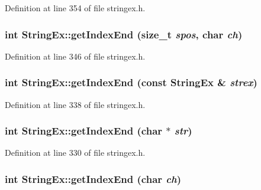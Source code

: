 Definition at line 354 of file stringex.h.\hypertarget{classStringEx_ab5c039e3571fd9d5d230ccd5e78c5bd}{
\subsubsection[{getIndexEnd}]{\setlength{\rightskip}{0pt plus 5cm}int StringEx::getIndexEnd (size\_\-t {\em spos}, \/  char {\em ch})}}
\label{classStringEx_ab5c039e3571fd9d5d230ccd5e78c5bd}




Definition at line 346 of file stringex.h.\hypertarget{classStringEx_10fce95cff1c083a94a8f705daab3e3d}{
\subsubsection[{getIndexEnd}]{\setlength{\rightskip}{0pt plus 5cm}int StringEx::getIndexEnd (const {\bf StringEx} \& {\em strex})}}
\label{classStringEx_10fce95cff1c083a94a8f705daab3e3d}




Definition at line 338 of file stringex.h.\hypertarget{classStringEx_413a4c5dd9733f92399d5b75eabfbf19}{
\subsubsection[{getIndexEnd}]{\setlength{\rightskip}{0pt plus 5cm}int StringEx::getIndexEnd (char $\ast$ {\em str})}}
\label{classStringEx_413a4c5dd9733f92399d5b75eabfbf19}




Definition at line 330 of file stringex.h.\hypertarget{classStringEx_35c910beac3d5410ca6d1b2d80ddb753}{
\subsubsection[{getIndexEnd}]{\setlength{\rightskip}{0pt plus 5cm}int StringEx::getIndexEnd (char {\em ch})}}
\label{classStringEx_35c910beac3d5410ca6d1b2d80ddb753}




